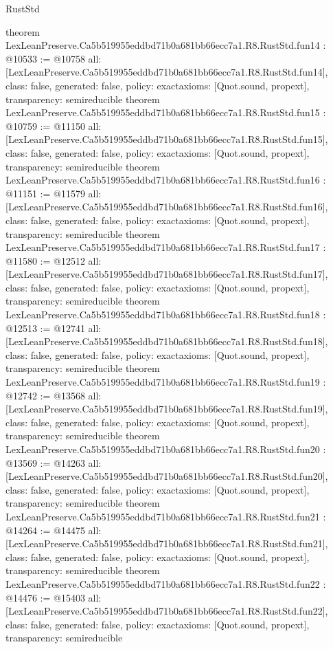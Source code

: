 \begin{lexlean}{RustStd}
\begin{coremodule}
{}
theorem LexLeanPreserve.Ca5b519955eddbd71b0a681bb66ecc7a1.R8.RustStd.fun14 : @10533 := @10758 {
  all: [LexLeanPreserve.Ca5b519955eddbd71b0a681bb66ecc7a1.R8.RustStd.fun14],
  class: false,
  generated: false,
  policy: exact{axioms: [Quot.sound, propext]},
  transparency: semireducible
}
theorem LexLeanPreserve.Ca5b519955eddbd71b0a681bb66ecc7a1.R8.RustStd.fun15 : @10759 := @11150 {
  all: [LexLeanPreserve.Ca5b519955eddbd71b0a681bb66ecc7a1.R8.RustStd.fun15],
  class: false,
  generated: false,
  policy: exact{axioms: [Quot.sound, propext]},
  transparency: semireducible
}
theorem LexLeanPreserve.Ca5b519955eddbd71b0a681bb66ecc7a1.R8.RustStd.fun16 : @11151 := @11579 {
  all: [LexLeanPreserve.Ca5b519955eddbd71b0a681bb66ecc7a1.R8.RustStd.fun16],
  class: false,
  generated: false,
  policy: exact{axioms: [Quot.sound, propext]},
  transparency: semireducible
}
theorem LexLeanPreserve.Ca5b519955eddbd71b0a681bb66ecc7a1.R8.RustStd.fun17 : @11580 := @12512 {
  all: [LexLeanPreserve.Ca5b519955eddbd71b0a681bb66ecc7a1.R8.RustStd.fun17],
  class: false,
  generated: false,
  policy: exact{axioms: [Quot.sound, propext]},
  transparency: semireducible
}
theorem LexLeanPreserve.Ca5b519955eddbd71b0a681bb66ecc7a1.R8.RustStd.fun18 : @12513 := @12741 {
  all: [LexLeanPreserve.Ca5b519955eddbd71b0a681bb66ecc7a1.R8.RustStd.fun18],
  class: false,
  generated: false,
  policy: exact{axioms: [Quot.sound, propext]},
  transparency: semireducible
}
theorem LexLeanPreserve.Ca5b519955eddbd71b0a681bb66ecc7a1.R8.RustStd.fun19 : @12742 := @13568 {
  all: [LexLeanPreserve.Ca5b519955eddbd71b0a681bb66ecc7a1.R8.RustStd.fun19],
  class: false,
  generated: false,
  policy: exact{axioms: [Quot.sound, propext]},
  transparency: semireducible
}
theorem LexLeanPreserve.Ca5b519955eddbd71b0a681bb66ecc7a1.R8.RustStd.fun20 : @13569 := @14263 {
  all: [LexLeanPreserve.Ca5b519955eddbd71b0a681bb66ecc7a1.R8.RustStd.fun20],
  class: false,
  generated: false,
  policy: exact{axioms: [Quot.sound, propext]},
  transparency: semireducible
}
theorem LexLeanPreserve.Ca5b519955eddbd71b0a681bb66ecc7a1.R8.RustStd.fun21 : @14264 := @14475 {
  all: [LexLeanPreserve.Ca5b519955eddbd71b0a681bb66ecc7a1.R8.RustStd.fun21],
  class: false,
  generated: false,
  policy: exact{axioms: [Quot.sound, propext]},
  transparency: semireducible
}
theorem LexLeanPreserve.Ca5b519955eddbd71b0a681bb66ecc7a1.R8.RustStd.fun22 : @14476 := @15403 {
  all: [LexLeanPreserve.Ca5b519955eddbd71b0a681bb66ecc7a1.R8.RustStd.fun22],
  class: false,
  generated: false,
  policy: exact{axioms: [Quot.sound, propext]},
  transparency: semireducible
}
\end{coremodule}
\end{lexlean}
